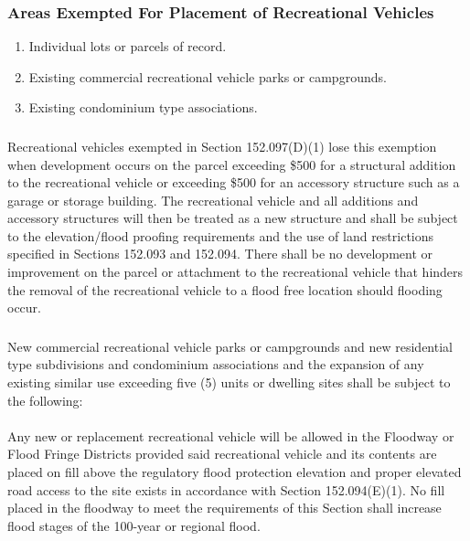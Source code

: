 \subsubsection{Areas Exempted For Placement of Recreational Vehicles}
\begin{enumerate}[{\indent}a)]
    \item Individual lots or parcels of record.
    \item Existing commercial recreational vehicle parks or campgrounds.
    \item Existing condominium type associations.
\end{enumerate}
\subsubsection{}
Recreational vehicles exempted in Section 152.097(D)(1) lose this exemption when development occurs on the parcel exceeding \$500 for a structural addition to the recreational vehicle or exceeding \$500 for an accessory structure such as a garage or storage building. The recreational vehicle and all additions and accessory structures will then be treated as a new structure and shall be subject to the elevation/flood proofing requirements and the use of land restrictions specified in Sections 152.093 and 152.094. There shall be no development or improvement on the parcel or attachment to the recreational vehicle that hinders the removal of the recreational vehicle to a flood free location should flooding occur.
\subsubsection{}
New commercial recreational vehicle parks or campgrounds and new residential type subdivisions and condominium associations and the expansion of any existing similar use exceeding five (5) units or dwelling sites shall be subject to the following:
\paragraph{}
Any new or replacement recreational vehicle will be allowed in the Floodway or Flood Fringe Districts provided said recreational vehicle and its contents are placed on fill above the regulatory flood protection elevation and proper elevated road access to the site exists in accordance with Section 152.094(E)(1). No fill placed in the floodway to meet the requirements of this Section shall increase flood stages of the 100-year or regional flood.
